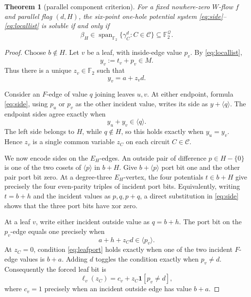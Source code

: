 \documentclass[11pt]{article}
\newtheorem{theorem}{Theorem}[section]
\theoremstyle{definition}
\theoremstyle{remark}
\newcommand{\F}{\mathbb F}
\newcommand{\Q}{\mathcal Q}
\newcommand{\C}{\mathcal C}
\newcommand{\Span}{\operatorname{span}}
\newcommand{\one}{\mathbf 1}
\numberwithin{equation}{section}
\begin{document}
\begin{theorem}[parallel component criterion]\label{thm:component}
For a fixed nowhere-zero \(W\)-flow \(f\) and parallel flag \((d,H)\),
the six-point one-hole potential system
\eqref{eq:side}--\eqref{eq:locallist} is soluble if and only if
\begin{equation}
             \beta_H\in
             \Span_{\F_2}\{\gamma_C^d:C\in\C\}
             \subseteq\F_2^{\Q}.                            \label{eq:span}
\end{equation}
\end{theorem}

\begin{proof}
Choose \(b\notin H\).  Let \(v\) be a leaf, with inside-edge value
\(p_v\).  By \eqref{eq:locallist},
\[
                         y_v:=t_v+p_v\in M.
\]
Thus there is a unique \(z_v\in\F_2\) such that
\begin{equation}
                         y_v=a+z_vd.                         \label{eq:y}
\end{equation}

Consider an \(F\)-edge of value \(q\) joining leaves \(u,v\).  At
either endpoint, formula \eqref{eq:side}, using \(p_u\) or \(p_v\) as
the other incident value, writes its side as
\(y+\langle q\rangle\).  The endpoint sides agree exactly when
\[
                         y_u+y_v\in\langle q\rangle.
\]
The left side belongs to \(H\), while \(q\notin H\), so this holds
exactly when \(y_u=y_v\).  Hence \(z_v\) is a single common variable
\(z_C\) on each circuit \(C\in\C\).

We now encode sides on the \(E_H\)-edges.  An outside pair of difference
\(p\in H-\{0\}\) is one of the two cosets of
\(\langle p\rangle\) in \(b+H\).  Give
\(b+\langle p\rangle\) port bit one and the other pair port bit zero.
At a degree-three \(E_H\)-vertex, the four potentials \(t\in b+H\)
give precisely the four even-parity triples of incident port bits.
Equivalently, writing \(t=b+h\) and the incident values as
\(p,q,p+q\), a direct substitution in \eqref{eq:side} shows that the
three port bits have xor zero.

At a leaf \(v\), write either incident outside value as \(q=b+h\).
The port bit on the \(p_v\)-edge equals one precisely when
\begin{equation}
                     a+h+z_Cd\in\langle p_v\rangle.          \label{eq:leafport}
\end{equation}
At \(z_C=0\), condition \eqref{eq:leafport} holds exactly when one of
the two incident \(F\)-edge values is \(b+a\).  Adding \(d\) toggles
the condition exactly when \(p_v\ne d\).  Consequently the forced
leaf bit is
\begin{equation}
 \ell_v(z_C)=c_v+z_C\one[p_v\ne d],                          \label{eq:ell}
\end{equation}
where \(c_v=1\) precisely when an incident outside edge has value
\(b+a\).


\end{proof}
\end{document}
